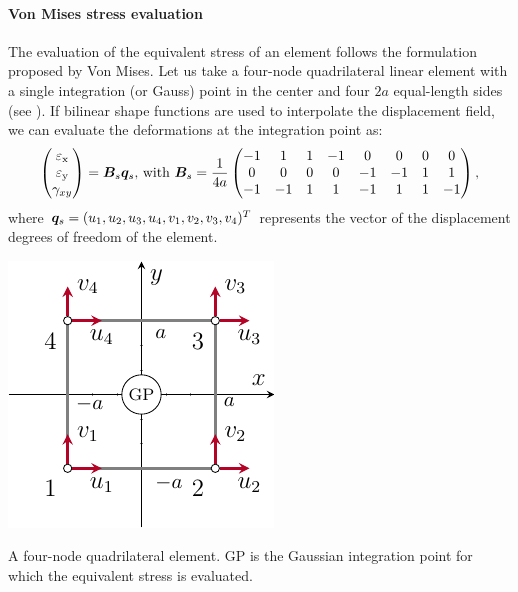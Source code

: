 \paragraph{Von Mises stress evaluation}
The evaluation of the equivalent stress of an element follows the formulation proposed by Von Mises. Let us take a four-node quadrilateral linear element with a single integration (or Gauss) point in the center and four $2a$ equal-length sides (see ). If bilinear shape functions are used to interpolate the displacement field, we can evaluate the deformations at the integration point as:
\begin{equation}
    \begin{pmatrix}
    \varepsilon_\text{x} \\
    \varepsilon_\text{y} \\
    \gamma_{xy}
    \end{pmatrix} = \bm{B}_s\bm{q}_s
    \textrm{,  with }
    \bm{B}_s =
    \frac{1}{4a}
    \begin{pmatrix}
    -1  &   1   &   1   &   -1  &   0   &   0   &   0   &   0   \\
    0   &   0   &   0   &   0   &   -1  &   -1  &   1   &   1   \\
    -1  &   -1  &   1   &   1   &   -1  &   1   &   1   &   -1
    \end{pmatrix},
\end{equation}
where $\bm{q}_s = (u_1, u_2, u_3, u_4, v_1, v_2, v_3, v_4)^T$ represents the vector of the displacement degrees of freedom of the element. 

\begin{marginfigure}
    \centering
    \includegraphics{figures/03_comparison_TO_TTO/03_gauss_point/gp.pdf}
    \caption{A four-node quadrilateral element. GP is the Gaussian integration point for which the equivalent stress is evaluated.}
    \label{fig:03_gp}
\end{marginfigure}


